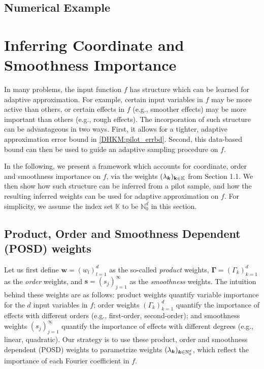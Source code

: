\documentclass[USenglish]{article}
\theoremstyle{dgthm}
\theoremstyle{dgthm}
\theoremstyle{dgthm}
\theoremstyle{dgthm}
\theoremstyle{dgdef}
\theoremstyle{definition}
\begin{document}
\subsection{Numerical Example}



\section{Inferring Coordinate and Smoothness Importance} 

In many problems, the input function $f$ has structure which can be learned for adaptive approximation. For example, certain input variables in $f$ may be more active than others, or certain effects in $f$ (e.g., smoother effects) may be more important than others (e.g., rough effects). The incorporation of such structure can be advantageous in two ways. First, it allows for a tighter, adaptive approximation error bound in \eqref{DHKM:pilot_errbd}. Second, this data-based bound can then be used to guide an adaptive sampling procedure on $f$.

In the following, we present a framework which accounts for coordinate, order and smoothness importance on $f$, via the weights $(\lambda_{\boldsymbol{k}})_{\mathbf{k} \in \mathbb{K}}$ from Section 1.1. We then show how such structure can be inferred from a pilot sample, and how the resulting inferred weights can be used for adaptive approximation on $f$. For simplicity, we assume the index set $\mathbb{K}$ to be $\mathbb{N}_0^d$ in this section.


\subsection{Product, Order and Smoothness Dependent (POSD) weights}
Let us first define $\mathbf{w} = (w_l)_{l=1}^d$ as the so-called \textit{product} weights, $\boldsymbol{\Gamma} = (\Gamma_k)_{k=1}^d$ as the \textit{order} weights, and $\mathbf{s} = (s_j)_{j=1}^\infty$ as the \textit{smoothness} weights. The intuition behind these weights are as follows: product weights quantify variable importance for the $d$ input variables in $f$; order weights $(\Gamma_k)_{k=1}^d$ quantify the importance of effects with different orders (e.g., first-order, second-order); and smoothness weights $(s_j)_{j=1}^\infty$ quantify the importance of effects with different degrees (e.g., linear, quadratic). Our strategy is to use these product, order and smoothness dependent (POSD) weights to parametrize weights $(\lambda_{{\boldsymbol{k}}})_{{\boldsymbol{k}} \in \mathbb{N}_0^d}$, which reflect the importance of each Fourier coefficient in $f$.
\end{document}
